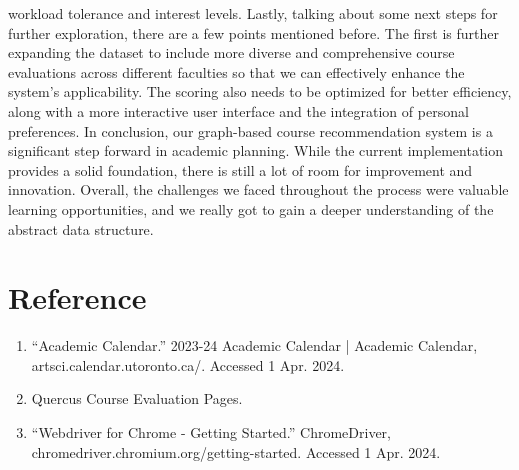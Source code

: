 \documentclass[fontsize=11pt]{article}
\begin{document}
workload tolerance and interest levels. Lastly, talking about some next steps for further exploration, there are a few points mentioned before. The first is further expanding the dataset to include more diverse and comprehensive course evaluations across different faculties so that we can effectively enhance the system's applicability. The scoring also needs to be optimized for better efficiency, along with a more interactive user interface and the integration of personal preferences. In conclusion, our graph-based course recommendation system is a significant step forward in academic planning. While the current implementation provides a solid foundation, there is still a lot of room for improvement and innovation. Overall, the challenges we faced throughout the process were valuable learning opportunities, and we really got to gain a deeper understanding of the abstract data structure.

\section*{Reference}
\begin{enumerate}
    \item “Academic Calendar.” 2023-24 Academic Calendar | Academic Calendar, artsci.calendar.utoronto.ca/. Accessed 1 Apr. 2024. 
    \item Quercus Course Evaluation Pages.
    \item “Webdriver for Chrome - Getting Started.” ChromeDriver, chromedriver.chromium.org/getting-started. Accessed 1 Apr. 2024. 
\end{enumerate}
\end{document}
